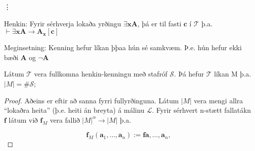 \documentclass[12pt]{book}
\begin{document}
\vdots


\begin{ath}
  Henkin: Fyrir sérhverja lokaða yrðingu \( \exists \mathbf{x}\mathbf{A}\), þá
  er til fasti \(\mathbf{c}\) í $\mathcal{T}$ þ.a. $\vdash  \exists \mathbf{x}\mathbf{A} \rightarrow  \mathbf{A}_{\mathbf{x}}[\mathbf{c}]$

  Meginsetning:
  Kenning hefur líkan þþaa hún sé samkvæm.
  Þ.e. hún hefur ekki bæði $\mathbf{A}$ og $\lnot \mathbf{A}$
\end{ath}


\begin{setn}
  Látum $\mathcal{T}$ vera fullkomna henkin-kenningu
  með stafróf $\mathcal{S}$. Þá hefur $\mathcal{T}$ líkan M
  þ.a. $|M| = \#\mathcal{S}$;

  \begin{proof}
    Aðeins er eftir að sanna fyrri fullyrðinguna.
    Látum $|M|$ vera mengi allra ``lokaðra heita'' (þ.e. heiti án breyta) á málinu
    $\mathcal{L}$. Fyrir sérhvert n-stætt fallatákn $\mathbf{f}$
    látum við $\mathbf{f}_M$ vera fallið $|M|^{\alpha} \rightarrow |M|$
    þ.a.

    \[\mathbf{f}_M ( \mathbf{a}_1, \dotsc,\mathbf{a}_n ) := \mathbf{f} \mathbf{a}, \dotsc, \mathbf{a}_n ,\]
    

\end{proof}
\end{setn}
\end{document}
